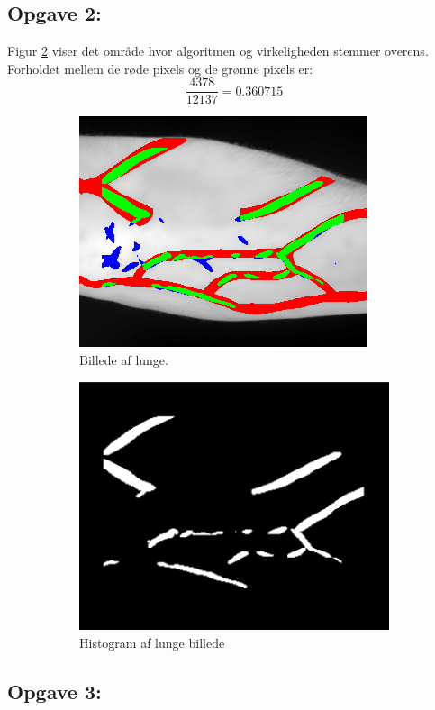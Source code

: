 \documentclass{article}
\begin{document}
\subsection{Opgave 2:}
Figur \ref{fig:f2} viser det område hvor algoritmen og virkeligheden stemmer overens. 
Forholdet mellem de røde pixels og de grønne pixels er: $$\frac{4378}{12137} = 0.360715$$
\begin{figure}[!h]
	\begin{subfigure}[b]{0.49\linewidth}
		\includegraphics[width=\linewidth]{RoBlood_result.png}
		\caption{Billede af lunge.}
		\label{fig:f1}
	\end{subfigure}
	\hfill
	\begin{subfigure}[b]{0.49\linewidth}
		\includegraphics[width=\linewidth]{greenPixels.png}
		\caption{Histogram af lunge billede}
		\label{fig:f2}
	\end{subfigure}
	\caption{}
	\label{fig:image1}
\end{figure}

\subsection{Opgave 3:}
\end{document}
